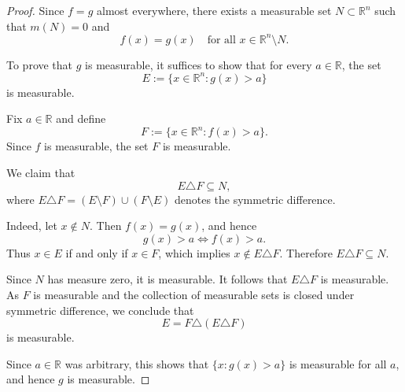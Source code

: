 \begin{proof}
Since $f=g$ almost everywhere, there exists a measurable set $N \subset \mathbb{R}^n$ such that $m(N)=0$ and
\[
f(x)=g(x) \quad \text{for all } x \in \mathbb{R}^n \setminus N.
\]

To prove that $g$ is measurable, it suffices to show that for every $a \in \mathbb{R}$, the set
\[
E := \{x \in \mathbb{R}^n : g(x) > a\}
\]
is measurable.

Fix $a \in \mathbb{R}$ and define
\[
F := \{x \in \mathbb{R}^n : f(x) > a\}.
\]
Since $f$ is measurable, the set $F$ is measurable.

We claim that
\[
E \triangle F \subseteq N,
\]
where $E \triangle F = (E \setminus F) \cup (F \setminus E)$ denotes the symmetric difference.

Indeed, let $x \notin N$. Then $f(x)=g(x)$, and hence
\[
g(x) > a \iff f(x) > a.
\]
Thus $x \in E$ if and only if $x \in F$, which implies $x \notin E \triangle F$. Therefore $E \triangle F \subseteq N$.

Since $N$ has measure zero, it is measurable. It follows that $E \triangle F$ is measurable. As $F$ is measurable and the collection of measurable sets is closed under symmetric difference, we conclude that
\[
E = F \triangle (E \triangle F)
\]
is measurable.

Since $a \in \mathbb{R}$ was arbitrary, this shows that $\{x : g(x) > a\}$ is measurable for all $a$, and hence $g$ is measurable.
\end{proof}